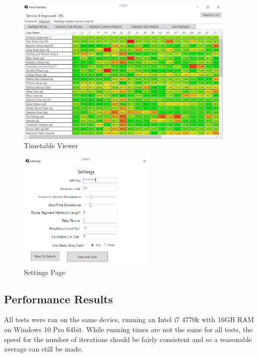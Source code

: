 \documentclass{article}
\begin{document}
\begin{figure}[H]
	\centering
	\includegraphics[width=400px]{images/timetableviewer.PNG}
	\caption{Timetable Viewer}
	\label{fig:timetbaleViewer}
\end{figure}


\begin{figure}[H]
	\centering
	\includegraphics[width=250px]{images/SettingsPage.PNG}
	\caption{Settings Page}
	\label{fig:settings}
\end{figure}

\newpage

\subsection{Performance Results}
\label{performance}

All tests were ran on the same device, running an Intel i7 4770k with 16GB RAM on Windows 10 Pro 64bit. While running times are not the same for all tests, the speed for the number of iterations should be fairly consistent and so a reasonable average can still be made.  
\end{document}
